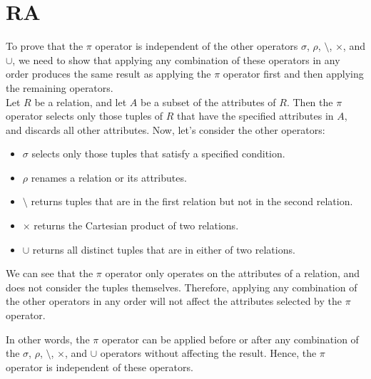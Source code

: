\section{RA}
To prove that the $\pi$ operator is independent of the other operators $\sigma$, $\rho$, $\setminus$, $\times$, and $\cup$, we need to show that applying any combination of these operators in any order produces the same result as applying the $\pi$ operator first and then applying the remaining operators.\\

Let $R$ be a relation, and let $A$ be a subset of the attributes of $R$. Then the $\pi$ operator selects only those tuples of $R$ that have the specified attributes in $A$, and discards all other attributes.
Now, let's consider the other operators:

\begin{itemize}
    \item $\sigma$ selects only those tuples that satisfy a specified condition.
    \item $\rho$ renames a relation or its attributes.
    \item $\setminus$ returns tuples that are in the first relation but not in the second relation.
    \item $\times$ returns the Cartesian product of two relations.
    \item $\cup$ returns all distinct tuples that are in either of two relations.
\end{itemize}

We can see that the $\pi$ operator only operates on the attributes of a relation, and does not consider the tuples themselves. Therefore, applying any combination of the other operators in any order will not affect the attributes selected by the $\pi$ operator.

In other words, the $\pi$ operator can be applied before or after any combination of the $\sigma$, $\rho$, $\setminus$, $\times$, and $\cup$ operators without affecting the result. Hence, the $\pi$ operator is independent of these operators.